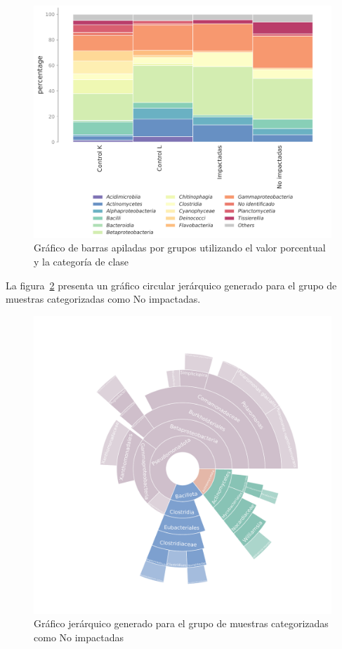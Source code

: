 \begin{figure}[H]
    \centering
    \includegraphics[width=1\linewidth,height=0.4\textheight]{images/pipeline/class_grouped_percentage.pdf}
    \caption{Gráfico de barras apiladas por grupos utilizando el valor porcentual y la categoría de clase}
    \label{fig:pipeline-stacked-group}
\end{figure}

La figura~\ref{fig:pipeline-core} presenta un gráfico circular jerárquico generado para el grupo de muestras categorizadas como No impactadas.
\begin{figure}[H]
    \centering
    \includegraphics[width=0.9\linewidth]{images/pipeline/core_Impactadas.pdf}
    \caption{Gráfico jerárquico generado para el grupo de muestras categorizadas como No impactadas}
    \label{fig:pipeline-core}
\end{figure}

